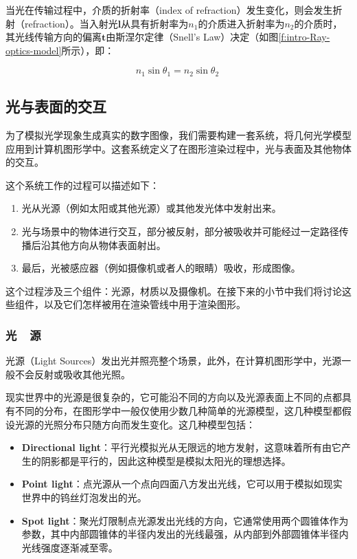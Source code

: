 当光在传输过程中，介质的折射率（index of refraction）发生变化，则会发生折射（refraction）。当入射光$\mathbf{l}$从具有折射率为$n_1$的介质进入折射率为$n_2$的介质时， 其光线传输方向的偏离$\mathbf{t}$由斯涅尔定律（Snell's Law）决定（如图\ref{f:intro-Ray-optics-model}所示），即：

\begin{equation}\label{eq:intro-snell-Law}
	n_1\sin\theta_1 = n_2\sin\theta_2\ 	
\end{equation}






\subsection{光与表面的交互}
为了模拟光学现象生成真实的数字图像，我们需要构建一套系统，将几何光学模型应用到计算机图形学中。这套系统定义了在图形渲染过程中，光与表面及其他物体的交互。

这个系统工作的过程可以描述如下：

\begin{enumerate}
	\item 光从光源（例如太阳或其他光源）或其他发光体中发射出来。
	\item 光与场景中的物体进行交互，部分被反射，部分被吸收并可能经过一定路径传播后沿其他方向从物体表面射出。
	\item 最后，光被感应器（例如摄像机或者人的眼睛）吸收，形成图像。
\end{enumerate}

这个过程涉及三个组件：光源，材质以及摄像机。在接下来的小节中我们将讨论这些组件，以及它们怎样被用在渲染管线中用于渲染图形。




\subsubsection{光~~源}\label{sec:intro-light-sources}
光源（Light Sources）发出光并照亮整个场景，此外，在计算机图形学中，光源一般不会反射或吸收其他光照。

现实世界中的光源是很复杂的，它可能沿不同的方向以及光源表面上不同的点都具有不同的分布，在图形学中一般仅使用少数几种简单的光源模型，这几种模型都假设光源的光照分布只随方向而发生变化。这几种模型包括：

\begin{itemize}
	\item \textbf{Directional light}：平行光模拟光从无限远的地方发射，这意味着所有由它产生的阴影都是平行的，因此这种模型是模拟太阳光的理想选择。
	\item \textbf{Point light}\index{Point Light}：点光源从一个点向四面八方发出光线，它可以用于模拟如现实世界中的钨丝灯泡发出的光。
	\item \textbf{Spot light}\index{Spot Light}：聚光灯限制点光源发出光线的方向，它通常使用两个圆锥体作为参数，其中内部圆锥体的半径内发出的光线最强，从内部到外部圆锥体半径内光线强度逐渐减至零。
\end{itemize}


